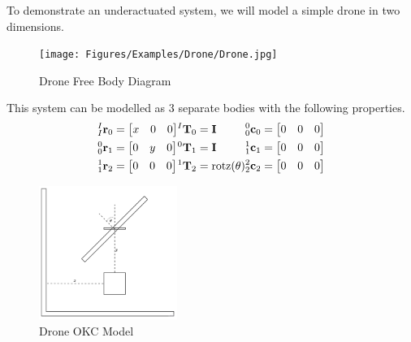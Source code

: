 \noindent To demonstrate an underactuated system, we will model a simple drone in two dimensions.

\begin{figure}[H]
    \centering
    \texttt{[image: Figures/Examples/Drone/Drone.jpg]}
    \caption{Drone Free Body Diagram}
    \label{fig:drone}
\end{figure}
\noindent This system can be modelled as 3 separate bodies with the following properties.
\begin{align*}
    \begin{split}
        {^I_I \mathbf{r}_0} &= \begin{bmatrix} x & 0 & 0\end{bmatrix} \\
        {^0_0 \mathbf{r} _1} &= \begin{bmatrix} 0 & y & 0 \end{bmatrix} \\ 
        {^1_1 \mathbf{r} _2} &= \begin{bmatrix} 0& 0& 0 \end{bmatrix}\\
    \end{split}
    \begin{split}
        {^I \mathbf{T}_0} &= {\mathbf{I}}\\
        {^0 \mathbf{T}_1} &= {\mathbf{I}}\\
        {^1 \mathbf{T}_2} &= \text{rotz}(\theta)\\
    \end{split}
    \begin{split}
    \end{split}
    \begin{split}
        {^0_0 \mathbf{c}_0} &= \begin{bmatrix} 0& 0& 0 \end{bmatrix}\\
        {^1_1 \mathbf{c} _1} &= \begin{bmatrix} 0& 0& 0 \end{bmatrix}\\
        {^2_2 \mathbf{c} _2} &= \begin{bmatrix} 0& 0& 0 \end{bmatrix}\\
    \end{split}
\end{align*}
\begin{figure}[H]
    \centering
    \includegraphics[width=0.4\textwidth]{Figures/Examples/Drone/DroneNE.png}
    \caption{Drone OKC Model}
    \label{fig:drone}
\end{figure}

